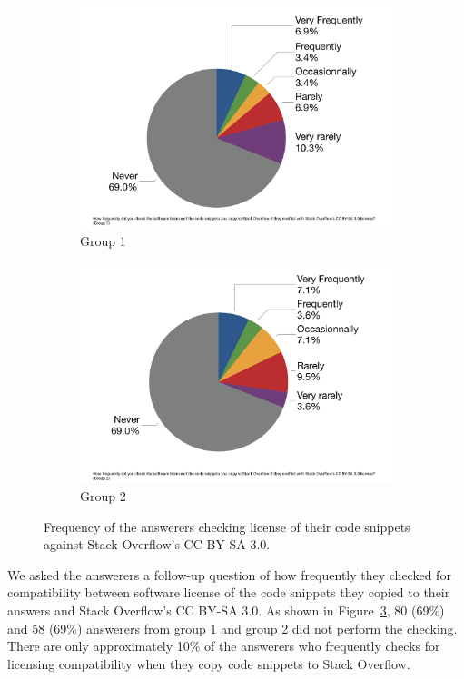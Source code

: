 \documentclass{svjour3}                     %
\begin{document}
\begin{figure}
	\begin{subfigure}{.5\textwidth}
		\centering
		\includegraphics[width=.75\linewidth]{survey_license_check_1}
		\caption{Group 1}
		\label{fig:survey_license_check_1}
	\end{subfigure}%
	\begin{subfigure}{.5\textwidth}
		\centering
		\includegraphics[width=.75\linewidth]{survey_license_check_2}
		\caption{Group 2}
		\label{fig:survey_license_check_2}
	\end{subfigure}
	\caption{Frequency of the answerers checking license of their code snippets against Stack Overflow's CC BY-SA 3.0.}
	\label{fig:survey_license_check}
\end{figure}

We asked the answerers a follow-up question of how frequently they checked for compatibility between software license of the code snippets they copied to their
answers and Stack Overflow's CC BY-SA 3.0. As shown in
Figure~\ref{fig:survey_license_check}, 80 (69\%) and 58 (69\%) answerers from
group 1 and group 2 did not perform the checking. There are only approximately
10\% of the answerers who frequently checks for licensing compatibility when they
copy code snippets to Stack Overflow.
\end{document}
